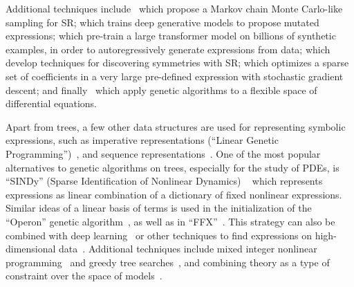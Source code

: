 \documentclass[letterpaper,twocolumn]{scrartcl}
\newcommand\sr{SR\xspace}
\begin{document}
Additional techniques include~\cite{jinBayesianSymbolicRegression2020,guimeraBayesianMachineScientist2020} which propose a Markov chain Monte Carlo-like sampling for \sr;
\cite{petersenDeepSymbolicRegression2021,liNeuralguidedSymbolicRegression2019} which trains deep generative models to propose mutated expressions;
\cite{dascoliDeepSymbolicRegression2022,kamiennyEndtoendSymbolicRegression2022} which pre-train a large transformer model on billions of synthetic examples, in order to autoregressively generate expressions from data;
\cite{udrescuAIFeynmanParetooptimal2020,liuAIPoincareMachine2020,wetzelDiscoveringSymmetryInvariants2020} which develop techniques for discovering symmetries with \sr;
\cite{sahooLearningEquationsExtrapolation2018} which optimizes a sparse set of coefficients in a very large pre-defined expression with stochastic gradient descent; and finally~\cite{atkinsonDatadrivenDiscoveryFreeform2019,rossBenchmarkingMachineLearning2022} which apply genetic algorithms to a flexible space of differential equations.

Apart from trees, a few other data structures are used for representing symbolic expressions, such as imperative representations (``Linear Genetic Programming'')~\citep[e.g.,][]{brameierComparisonLinearGenetic2001,guvenLinearGeneticProgramming2009,maEvolvingSymbolicDensity2022,diasDescribingQuantumInspiredLinear2012}, and sequence representations~\citep[e.g.,][]{liuAIPoincareMachine2020,dascoliDeepSymbolicRegression2022,kamiennyEndtoendSymbolicRegression2022}.
One of the most popular alternatives to genetic algorithms on trees, especially for the study of PDEs, is ``SINDy'' (Sparse Identification of Nonlinear Dynamics) ~\cite{bruntonDiscoveringGoverningEquations2016,rudyDatadrivenDiscoveryPartial2017,championDatadrivenDiscoveryCoordinates2019} which represents expressions as linear combination of a dictionary of fixed nonlinear expressions.
Similar ideas of a linear basis of terms is used in the initialization of the ``Operon'' genetic algorithm~\cite{burlacuOperonEfficientGenetic2020}, as well as in ``FFX''~\cite{mcconaghyFFXFastScalable2011}.
This strategy can also be combined with deep learning~\citep[e.g., ][]{luschDeepLearningUniversal2018,championDatadrivenDiscoveryCoordinates2019,bothDeepMoDDeepLearning2019,chenDeepLearningPhysical2020,rackauckasUniversalDifferentialEquations2020} or other techniques to find expressions on high-dimensional data~\citep[e.g., ][]{rossBenchmarkingMachineLearning2022}.
Additional techniques include mixed integer nonlinear programming~\citep{cozadGlobalMINLPApproach2018} and greedy tree searches~\citep{defrancaGreedySearchTree2018}, and combining theory as a type of constraint over the space of models~\cite{cornelioAIDescartesCombining2021}.
\end{document}
